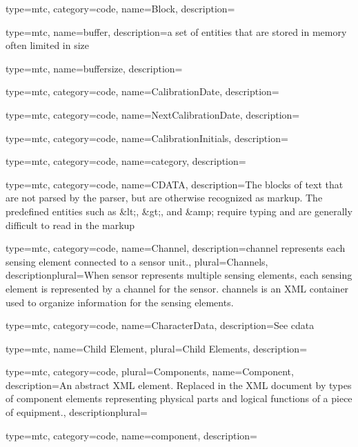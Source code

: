 {
  type=mtc,
  category=code,
  name={Block},
  description={}
}

{
  type=mtc,
  name=buffer,
  description={a set of entities that are stored in memory often limited in size}
}

{
  type=mtc,
  name=buffersize,
  description={}
}

{
  type=mtc,
  category=code,
  name={CalibrationDate},
  description={}
}

{
  type=mtc,
  category=code,
  name={NextCalibrationDate},
  description={}
}

{
  type=mtc,
  category=code,
  name={CalibrationInitials},
  description={}
}

{
  type=mtc,
  category=code,
  name={category},
  description={}
}

{
  type=mtc,
  category=code,
  name=CDATA,
  description={The blocks of text that are not parsed by the parser, but are otherwise recognized as markup. The predefined entities such as \&lt;, \&gt;, and \&amp; require typing and are generally difficult to read in the markup}
}

{
  type=mtc,
  category=code,
  name={Channel},
  description={\gls{channel} represents each \gls{sensing element} connected to a \gls{sensor unit}.},
  plural={Channels},
  descriptionplural={When \gls{sensor} represents multiple \glspl{sensing element}, each \gls{sensing element} is represented by a \gls{channel} for the \gls{sensor}. \glspl{channel} is an XML container used to organize information for the \glspl{sensing element}. }
}


{
  type=mtc,
  category=code,
  name={CharacterData},
  description={See \gls{cdata}}
}

{
  type=mtc,
  name={Child Element},
  plural={Child Elements},
  description={}
}

{
  type=mtc,
  category=code,
  plural={Components},
  name={Component},
  description={An abstract XML element. Replaced in the XML document by types of \gls{component} elements representing physical parts and logical functions of a piece of equipment.},
  descriptionplural={}
 }

{
  type=mtc,
  category=code,
  name={component},
  description={}
}


